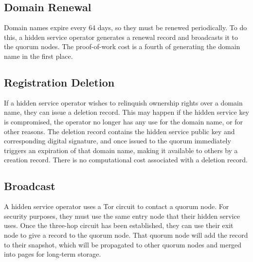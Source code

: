\subsection{Domain Renewal}

Domain names expire every 64 days, so they must be renewed periodically. To do this, a hidden service operator generates a renewal record and broadcasts it to the quorum nodes. The proof-of-work cost is a fourth of generating the domain name in the first place.

\subsection{Registration Deletion}

If a hidden service operator wishes to relinquish ownership rights over a domain name, they can issue a deletion record. This may happen if the hidden service key is compromised, the operator no longer has any use for the domain name, or for other reasons. The deletion record contains the hidden service public key and corresponding digital signature, and once issued to the quorum immediately triggers an expiration of that domain name, making it available to others by a creation record. There is no computational cost associated with a deletion record. 

\subsection{Broadcast}

A hidden service operator uses a Tor circuit to contact a quorum node. For security purposes, they must use the same entry node that their hidden service uses. Once the three-hop circuit has been established, they can use their exit node to give a record to the quorum node. That quorum node will add the record to their snapshot, which will be propagated to other quorum nodes and merged into pages for long-term storage.

